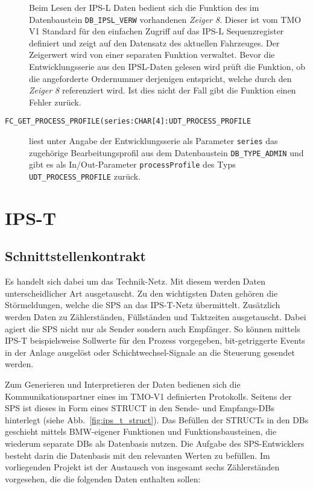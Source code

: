 \begin{description}
    Beim Lesen der IPS-L Daten bedient sich die Funktion des im Datenbaustein \texttt{DB\_IPSL\_VERW} vorhandenen \emph{Zeiger 8}. Dieser ist vom TMO V1 Standard für den einfachen Zugriff auf das IPS-L Sequenzregister definiert und zeigt auf den Datensatz des aktuellen Fahrzeuges. Der Zeigerwert wird von einer separaten Funktion verwaltet. Bevor die Entwicklungsserie aus den IPSL-Daten gelesen wird prüft die Funktion, ob die angeforderte Ordernummer derjenigen entspricht, welche durch den \emph{Zeiger 8} referenziert wird. Ist dies nicht der Fall gibt die Funktion einen Fehler zurück.\leer
    
    \item [\texttt{FC\_GET\_PROCESS\_PROFILE(series:CHAR[4]:UDT\_PROCESS\_PROFILE}] liest unter Angabe der Entwicklungsserie als Parameter \texttt{series} das zugehörige Bearbeitungsprofil aus dem Datenbaustein \texttt{DB\_TYPE\_ADMIN} und gibt es als In/Out-Parameter \texttt{processProfile} des Typs \texttt{UDT\_PROCESS\_PROFILE} zurück.
    
\end{description}


\section{IPS-T}
\label{sec:ips_t}

\subsection{Schnittstellenkontrakt}
\label{subsec:ips_t_contract}

 Es handelt sich dabei um das Technik-Netz. Mit diesem werden Daten unterscheidlicher Art ausgetauscht. Zu den wichtigsten Daten gehören die Störmeldungen, welche die SPS an das IPS-T-Netz übermittelt. Zusätzlich werden Daten zu Zählerständen, Füllständen und Taktzeiten ausgetauscht. Dabei agiert die SPS nicht nur als Sender sondern auch Empfänger. So können mittels IPS-T beispielsweise Sollwerte für den Prozess  vorgegeben, bit-getriggerte Events in der Anlage ausgelöst oder Schichtwechsel-Signale an die Steuerung gesendet werden. 


Zum Generieren und Interpretieren der Daten bedienen sich die Kommunikationspartner eines im TMO-V1 definierten Protokolls. Seitens der SPS ist dieses in Form eines STRUCT in den Sende- und Empfangs-DBs hinterlegt (siehe Abb.~\ref{fig:ips_t_struct}). Das Befüllen der STRUCTs in den DBs geschieht mittels BMW-eigener Funktionen und Funktionsbausteinen, die wiederum separate DBs als Datenbasis nutzen. Die Aufgabe des SPS-Entwicklers besteht darin die Datenbasis mit den relevanten Werten zu befüllen. Im vorliegenden Projekt ist der Austausch von insgesamt sechs Zählerständen vorgesehen, die die folgenden Daten enthalten sollen: 

